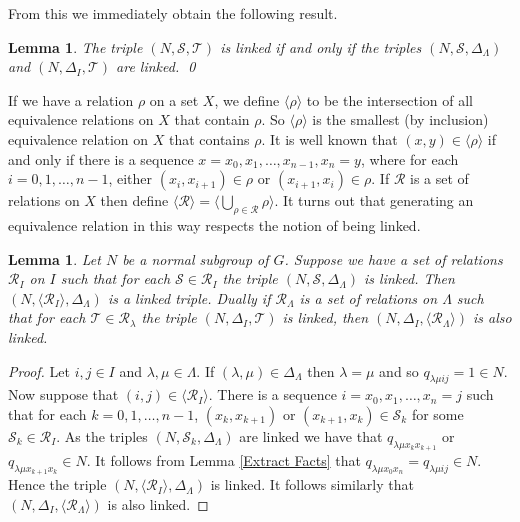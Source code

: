 \documentclass[a4paper, 12pt,reqno]{amsart}
\theoremstyle{plain}
\newtheorem{lemma}[thm]{Lemma}
\theoremstyle{definition}
\theoremstyle{remark}
\begin{document}
From this we immediately obtain the following result.

\begin{lemma}
    \label{Linked equivalence}
    The triple $(N,\mathcal{S},\mathcal{T}) $ is linked if and only if the triples $(N,\mathcal{S},\Delta_\Lambda)$ and $(N,\Delta_I,\mathcal{T})$ are linked. \qed 
\end{lemma}

If we have a relation $\rho$ on a set $X$, we define $\langle \rho \rangle$ to be the intersection of all equivalence relations on $X$ that contain $\rho$.
So $\langle \rho \rangle$ is the smallest (by inclusion) equivalence relation on $X$ that contains $\rho$.
It is well known that $(x,y) \in \langle \rho \rangle$ if and only if there is a sequence $x = x_0 , x_1 , \dots , x_{n-1},x_n = y$, where for each $i = 0 , 1,\dots,n-1$, either $(x_i,x_{i+1}) \in \rho$ or $(x_{i+1},x_i) \in \rho$.
If $\mathcal{R}$ is a set of relations on $X$ then define $\langle \mathcal{R} \rangle = \langle \bigcup_{\rho \in \mathcal{R}} \rho \rangle$.
It turns out that generating an equivalence relation in this way respects the notion of being linked.

\begin{lemma}
    \label{gen implies linked}
    Let $N$ be a normal subgroup of $G$.
    Suppose we have a set of relations $\mathcal{R}_I$ on $I$ such that for each $\mathcal{S} \in \mathcal{R}_I$ the triple $(N,\mathcal{S},\Delta_\Lambda)$ is linked.
    Then $(N,\langle \mathcal{R}_I \rangle,\Delta_\Lambda) $ is a linked triple.
    Dually if $\mathcal{R}_\Lambda$ is a set of relations on $\Lambda$ such that for each $\mathcal{T} \in \mathcal{R}_\lambda$ the triple $(N,\Delta_I,\mathcal{T})$ is linked, then $(N,\Delta_I,\langle \mathcal{R}_\Lambda\rangle)$ is also linked.
\end{lemma}

\begin{proof}
    Let $i,j \in I$ and $\lambda,\mu \in \Lambda$.
    If $(\lambda,\mu) \in \Delta_\Lambda$ then $\lambda = \mu$ and so $q_{\lambda \mu i j} = 1 \in N$.
    Now suppose that $(i,j) \in \langle \mathcal{R}_I \rangle$.
    There is a sequence $i = x_0 , x_1 , \dots , x_n = j$ such that for each $k=0,1, \dots, n-1$, $(x_k,x_{k+1})$ or $(x_{k+1} , x_k) \in \mathcal{S}_k$ for some $\mathcal{S}_k \in \mathcal{R}_I$.
    As the triples $(N,\mathcal{S}_k,\Delta_\Lambda)$ are linked we have that $q_{\lambda \mu x_{k} x_{k+1}}$ or $q_{\lambda \mu x_{k+1} x_k} \in N$.
    It follows from Lemma \ref{Extract Facts} that $q_{\lambda \mu x_0 x_n} = q_{\lambda \mu i j} \in N$.
    Hence the triple $(N,\langle \mathcal{R}_I \rangle,\Delta_\Lambda)$ is linked.
    It follows similarly that $(N,\Delta_I,\langle \mathcal{R}_\Lambda\rangle)$ is also linked.
\end{proof}
\end{document}
